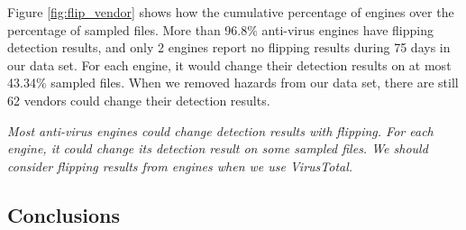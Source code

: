 
Figure \ref{fig:flip_vendor} shows how the cumulative percentage of engines over the percentage of sampled files. More than 96.8\% anti-virus engines have flipping detection results, and only 2 engines report no flipping results during 75 days in our data set. For each engine, it would change their detection results on at most 43.34\% sampled files. When we removed hazards from our data set, there are still 62 vendors could change their detection results.

{\it{Most anti-virus engines could change detection results with flipping. For each engine, it could change its detection result on some sampled files. We should consider flipping results from engines when we use VirusTotal.
}}











\subsection{Conclusions}
